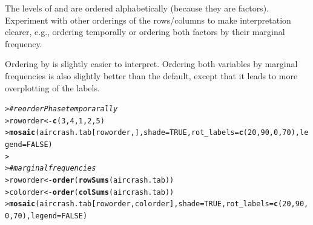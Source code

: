 \documentclass[10pt]{report}\usepackage[]{graphicx}\usepackage[]{color}
\makeatletter
\newcommand{\hlnum}[1]{\textcolor[rgb]{0.686,0.059,0.569}{#1}}%
\newcommand{\hlcom}[1]{\textcolor[rgb]{0.678,0.584,0.686}{\textit{#1}}}%
\newcommand{\hlstd}[1]{\textcolor[rgb]{0.345,0.345,0.345}{#1}}%
\newcommand{\hlkwb}[1]{\textcolor[rgb]{0.69,0.353,0.396}{#1}}%
\newcommand{\hlkwc}[1]{\textcolor[rgb]{0.333,0.667,0.333}{#1}}%
\newcommand{\hlkwd}[1]{\textcolor[rgb]{0.737,0.353,0.396}{\textbf{#1}}}%
\newenvironment{kframe}{%
 \def\at@end@of@kframe{}%
 \ifinner\ifhmode%
  \def\at@end@of@kframe{\end{minipage}}%
  \begin{minipage}{\columnwidth}%
 \fi\fi%
 \def\FrameCommand##1{\hskip\@totalleftmargin \hskip-\fboxsep
 \colorbox{shadecolor}{##1}\hskip-\fboxsep
     \hskip-\linewidth \hskip-\@totalleftmargin \hskip\columnwidth}%
 \MakeFramed {\advance\hsize-\width
   \@totalleftmargin\z@ \linewidth\hsize
   \@setminipage}}%
 {\par\unskip\endMakeFramed%
 \at@end@of@kframe}
\newenvironment{knitrout}{}{} %
\renewenvironment{knitrout}{\small\renewcommand{\baselinestretch}{.85}}{} %
\makeatother
\begin{document}
\begin{Exercises}
\begin{enumerate*}
    \item The levels of  and  are ordered alphabetically (because they are factors).  Experiment with 
    other orderings of the rows/columns to make interpretation clearer, e.g., ordering  temporally or ordering
    both factors by their marginal frequency.
    \begin{ans}
    Ordering by  is slightly easier to interpret.  Ordering both variables by marginal frequencies is
    also slightly better than the default, except that it leads to more overplotting of the labels.
\begin{knitrout}\footnotesize
{}\color{fgcolor}\begin{kframe}
\begin{alltt}
\hlstd{> }\hlcom{# reorder Phase temporarally}
\hlstd{> }\hlstd{roworder} \hlkwb{<-} \hlkwd{c}\hlstd{(}\hlnum{3}\hlstd{,} \hlnum{4}\hlstd{,} \hlnum{1}\hlstd{,} \hlnum{2}\hlstd{,} \hlnum{5}\hlstd{)}
\hlstd{> }\hlkwd{mosaic}\hlstd{(aircrash.tab[roworder,],} \hlkwc{shade}\hlstd{=}\hlnum{TRUE}\hlstd{,} \hlkwc{rot_labels}\hlstd{=}\hlkwd{c}\hlstd{(}\hlnum{20}\hlstd{,}\hlnum{90}\hlstd{,}\hlnum{0}\hlstd{,}\hlnum{70}\hlstd{),} \hlkwc{legend}\hlstd{=}\hlnum{FALSE}\hlstd{)}
\hlstd{> }
\hlstd{> }\hlcom{# marginal frequencies}
\hlstd{> }\hlstd{roworder} \hlkwb{<-} \hlkwd{order}\hlstd{(}\hlkwd{rowSums}\hlstd{(aircrash.tab))}
\hlstd{> }\hlstd{colorder} \hlkwb{<-} \hlkwd{order}\hlstd{(}\hlkwd{colSums}\hlstd{(aircrash.tab))}
\hlstd{> }\hlkwd{mosaic}\hlstd{(aircrash.tab[roworder, colorder],} \hlkwc{shade}\hlstd{=}\hlnum{TRUE}\hlstd{,} \hlkwc{rot_labels}\hlstd{=}\hlkwd{c}\hlstd{(}\hlnum{20}\hlstd{,}\hlnum{90}\hlstd{,}\hlnum{0}\hlstd{,}\hlnum{70}\hlstd{),} \hlkwc{legend}\hlstd{=}\hlnum{FALSE}\hlstd{)}
\end{alltt}
\end{kframe}


\end{knitrout}
\end{ans}
\end{enumerate*}
\end{Exercises}
\end{document}
